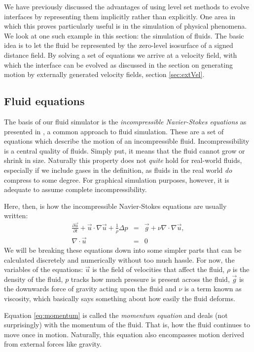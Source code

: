 We have previously discussed the advantages of using level set methods to evolve interfaces by representing them implicitly rather than explicitly. One area in which this proves particularly useful is in the simulation of physical phenomena. We look at one such example in this section: the simulation of fluids.
The basic idea is to let the fluid be represented by the zero-level isosurface of a signed distance field. By solving a set of equations we arrive at a velocity field, with which the interface can be evolved as discussed in the section on generating motion by externally generated velocity fields, section \vref{sec:extVel}.

\subsection{Fluid equations}
The basis of our fluid simulator is the \emph{incompressible Navier-Stokes equations} as presented in , a common approach to fluid simulation. These are a set of equations which describe the motion of an incompressible fluid. Incompressibility is a central quality of fluids. Simply put, it means that the fluid cannot grow or shrink in size. Naturally this property does not \textit{quite} hold for real-world fluids, especially if we include gases in the definition, as fluids in the real world \textit{do} compress to some degree. For graphical simulation purposes, however, it is adequate to assume complete incompressibility.

Here, then, is how the incompressible Navier-Stokes equations are usually written:
\begin{eqnarray}
\label{eq:momentum}
\frac{\partial\vec{u}}{\partial t}+\vec{u} \cdot \nabla\vec{u} + \frac{1}{\rho}\Delta p &=& \vec{g}+\nu\nabla\cdot\nabla\vec{u},\\
\label{eq:incomp}
\nabla\cdot\vec{u}&=&0
\end{eqnarray}
We will be breaking these equations down into some simpler parts that can be calculated discretely and numerically without too much hassle. For now, the variables of the equations: $\vec u$ is the field of velocities that affect the fluid, $\rho$ is the density of the fluid, $p$ tracks how much pressure is present across the fluid, $\vec{g}$ is the downwards force of gravity acting upon the fluid and $\nu$ is a term known as viscosity, which basically says something about how easily the fluid deforms.

Equation \vref{eq:momentum} is called the \emph{momentum equation} and deals (not surprisingly) with the momentum of the fluid. That is, how the fluid continues to move once in motion. Naturally, this equation also encompasses motion derived from external forces like gravity.

